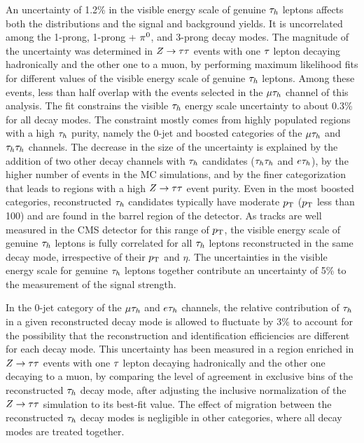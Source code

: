 An uncertainty of 1.2\% in the visible energy scale of genuine $\tau_{h}$ leptons affects both the distributions and the
signal and background yields. It is uncorrelated among the 1-prong, 1-prong + $\pi^{0}$, and
3-prong decay modes.
The magnitude of the uncertainty was determined in $Z\to\tau\tau$ events with one $\tau$ lepton decaying hadronically 
and the other one to a muon, by performing maximum likelihood fits for different values of the visible energy scale of 
genuine $\tau_{h}$ leptons. Among these events, less than half overlap with the events selected in the $\mu\tau_{h}$ 
channel of this analysis. The fit constrains the visible $\tau_{h}$ energy scale uncertainty to about
0.3\% for all decay modes. The constraint mostly comes from highly populated regions with a high $\tau_{h}$ purity, namely 
the 0-jet and boosted categories of the $\mu\tau_{h}$ and $\tau_{h}\tau_{h}$ channels. The decrease in the size of the 
uncertainty is explained by the addition of two other decay channels
with $\tau_{h}$ candidates ($\tau_{h}\tau_{h}$ and $e\tau_{h}$), by the higher number of events in the MC simulations, and by the 
finer categorization that leads to regions with a high $Z\to\tau\tau$ event purity.
Even in the most boosted categories, reconstructed $\tau_{h}$ candidates typically have moderate $p_\mathrm{T}$ ($p_\mathrm{T}$ less than 100\GeV) and are
found in the barrel region of the detector. As tracks are well measured in the CMS detector for this range of $p_\mathrm{T}$,
the visible energy scale of genuine $\tau_{h}$ leptons is fully correlated for all $\tau_{h}$ leptons reconstructed in the 
same decay mode, irrespective of their $p_\mathrm{T}$ and $\eta$. The uncertainties in the visible energy scale for genuine 
$\tau_{h}$ leptons together contribute an uncertainty of 5\% to the measurement of the signal strength.

In the 0-jet category of the $\mu\tau_{h}$ and $e\tau_{h}$ channels, the relative contribution of $\tau_{h}$ in a given
reconstructed decay mode is allowed to fluctuate by 3\% to account for the possibility that the reconstruction and
identification efficiencies are different for each decay mode. This uncertainty has been measured in a region enriched 
in $Z\to\tau\tau$ events with one $\tau$ lepton decaying hadronically and the other one decaying to a muon, by 
comparing the level of agreement in exclusive bins of the reconstructed $\tau_{h}$ decay mode, after adjusting the inclusive 
normalization of the $Z\to\tau\tau$ simulation to its best-fit value. The effect of migration between the reconstructed 
$\tau_{h}$ decay modes is negligible in other categories, where
all decay modes are treated together.

